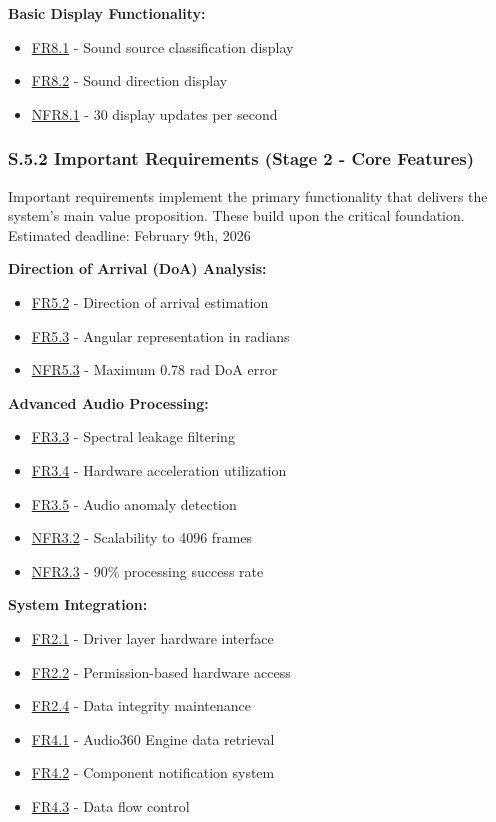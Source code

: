 \documentclass[12pt]{article}
\theoremstyle{definition}
\begin{document}
\textbf{Basic Display Functionality:}
\begin{itemize}
    \item \hyperref[FR8_1]{FR8.1} - Sound source classification display
    \item \hyperref[FR8_2]{FR8.2} - Sound direction display
    \item \hyperref[NFR8_1]{NFR8.1} - 30 display updates per second
\end{itemize}

\subsubsection{S.5.2 Important Requirements (Stage 2 - Core Features)}

Important requirements implement the primary functionality that delivers the
system's main value proposition. These build upon the critical foundation. \\
\newline
Estimated deadline: February 9th, 2026 \\
\newline

\textbf{Direction of Arrival (DoA) Analysis:}
\begin{itemize}
    \item \hyperref[FR5_2]{FR5.2} - Direction of arrival estimation
    \item \hyperref[FR5_3]{FR5.3} - Angular representation in radians
    \item \hyperref[NFR5_3]{NFR5.3} - Maximum 0.78 rad DoA error
\end{itemize}

\textbf{Advanced Audio Processing:}
\begin{itemize}
    \item \hyperref[FR3_3]{FR3.3} - Spectral leakage filtering
    \item \hyperref[FR3_4]{FR3.4} - Hardware acceleration utilization
    \item \hyperref[FR3_5]{FR3.5} - Audio anomaly detection
    \item \hyperref[NFR3_2]{NFR3.2} - Scalability to 4096 frames
    \item \hyperref[NFR3_3]{NFR3.3} - 90\% processing success rate
\end{itemize}

\textbf{System Integration:}
\begin{itemize}
    \item \hyperref[FR2_1]{FR2.1} - Driver layer hardware interface
    \item \hyperref[FR2_2]{FR2.2} - Permission-based hardware access
    \item \hyperref[FR2_4]{FR2.4} - Data integrity maintenance
    \item \hyperref[FR4_1]{FR4.1} - Audio360 Engine data retrieval
    \item \hyperref[FR4_2]{FR4.2} - Component notification system
    \item \hyperref[FR4_3]{FR4.3} - Data flow control
\end{itemize}
\end{document}
